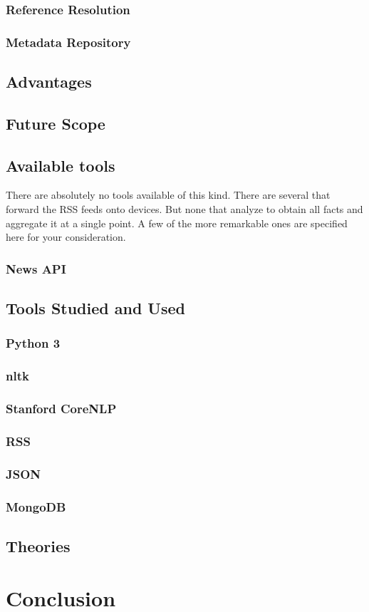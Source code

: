 \documentclass{srmreport}
\begin{document}
\subsection{Reference Resolution}
\subsection{Metadata Repository}

\section{Advantages}

\section{Future Scope}


\section{Available tools}
There are absolutely no tools available of this kind. There are several that forward the RSS feeds onto devices. But none that analyze to obtain all facts and aggregate it at a single point. A few of the more remarkable ones are specified here for your consideration.

\subsection{News API}


\section{Tools Studied and Used}
\subsection{Python 3}
\subsection{nltk}
\subsection{Stanford CoreNLP}
\subsection{RSS}
\subsection{JSON}
\subsection{MongoDB}

\section{Theories}

\chapter{Conclusion}


\end{document}
